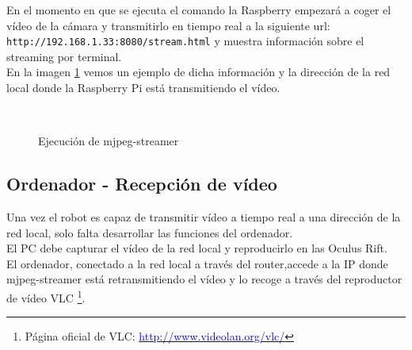 \documentclass[twoside, 11pt]{epstfg}
\begin{document}
En el momento en que se ejecuta el comando la Raspberry empezará a coger el vídeo de la cámara y transmitirlo en tiempo real a la siguiente url: \texttt{http://192.168.1.33:8080/stream.html} y muestra información sobre el streaming por terminal.\\
En la imagen \ref{fig::stream} vemos un ejemplo de dicha información y la dirección de la red local donde la Raspberry Pi está transmitiendo el vídeo.



\begin{figure}[H]
	\centering
	\hspace{2cm}
	\\
	\caption{Ejecución de mjpeg-streamer}
	\label{fig::stream}
\end{figure}


\subsection{Ordenador - Recepción de vídeo}
Una vez el robot es capaz de transmitir vídeo a tiempo real a una dirección de la red local, solo falta desarrollar las funciones del ordenador.\\
El PC debe capturar el vídeo de la red local y reproducirlo en las Oculus Rift.\\
El ordenador, conectado a la red local a través del router,accede a la IP donde mjpeg-streamer está retransmitiendo el vídeo y lo recoge a través del reproductor de vídeo VLC \footnote{Página oficial de VLC:  \href{http://www.videolan.org/vlc/}{\textcolor{blue}{http://www.videolan.org/vlc/}}}.
\end{document}
